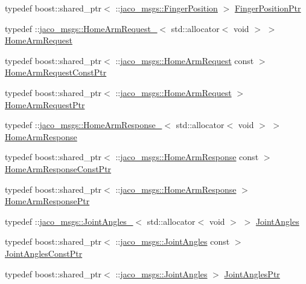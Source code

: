 \begin{DoxyCompactItemize}
typedef boost\+::shared\+\_\+ptr$<$ \+::\hyperlink{namespacejaco__msgs_a8d92f0e718e45f82b621ddf049a2f110}{jaco\+\_\+msgs\+::\+Finger\+Position} $>$ \hyperlink{namespacejaco__msgs_a07dcbbbd6b126792a3b2cbd5d9f055e3}{Finger\+Position\+Ptr}
\item 
typedef \+::\hyperlink{structjaco__msgs_1_1HomeArmRequest__}{jaco\+\_\+msgs\+::\+Home\+Arm\+Request\+\_\+}$<$ std\+::allocator$<$ void $>$ $>$ \hyperlink{namespacejaco__msgs_a8c93ee6cb88452df5f0a3c5aec628121}{Home\+Arm\+Request}
\item 
typedef boost\+::shared\+\_\+ptr$<$ \+::\hyperlink{namespacejaco__msgs_a8c93ee6cb88452df5f0a3c5aec628121}{jaco\+\_\+msgs\+::\+Home\+Arm\+Request} const  $>$ \hyperlink{namespacejaco__msgs_a120fe0caf767ec219caede5034da5237}{Home\+Arm\+Request\+Const\+Ptr}
\item 
typedef boost\+::shared\+\_\+ptr$<$ \+::\hyperlink{namespacejaco__msgs_a8c93ee6cb88452df5f0a3c5aec628121}{jaco\+\_\+msgs\+::\+Home\+Arm\+Request} $>$ \hyperlink{namespacejaco__msgs_adacfa509f618d56afb61601724347ef7}{Home\+Arm\+Request\+Ptr}
\item 
typedef \+::\hyperlink{structjaco__msgs_1_1HomeArmResponse__}{jaco\+\_\+msgs\+::\+Home\+Arm\+Response\+\_\+}$<$ std\+::allocator$<$ void $>$ $>$ \hyperlink{namespacejaco__msgs_a2638ebb5f2f675bb527ce4144b66d386}{Home\+Arm\+Response}
\item 
typedef boost\+::shared\+\_\+ptr$<$ \+::\hyperlink{namespacejaco__msgs_a2638ebb5f2f675bb527ce4144b66d386}{jaco\+\_\+msgs\+::\+Home\+Arm\+Response} const  $>$ \hyperlink{namespacejaco__msgs_af03d62d3bf564dc6a378a3b4f2d4fdcd}{Home\+Arm\+Response\+Const\+Ptr}
\item 
typedef boost\+::shared\+\_\+ptr$<$ \+::\hyperlink{namespacejaco__msgs_a2638ebb5f2f675bb527ce4144b66d386}{jaco\+\_\+msgs\+::\+Home\+Arm\+Response} $>$ \hyperlink{namespacejaco__msgs_a4bb26e957ea3bfdff2150cc2adcaef08}{Home\+Arm\+Response\+Ptr}
\item 
typedef \+::\hyperlink{structjaco__msgs_1_1JointAngles__}{jaco\+\_\+msgs\+::\+Joint\+Angles\+\_\+}$<$ std\+::allocator$<$ void $>$ $>$ \hyperlink{namespacejaco__msgs_ae38be3f0cdaac5905b3df022403d6ef4}{Joint\+Angles}
\item 
typedef boost\+::shared\+\_\+ptr$<$ \+::\hyperlink{namespacejaco__msgs_ae38be3f0cdaac5905b3df022403d6ef4}{jaco\+\_\+msgs\+::\+Joint\+Angles} const  $>$ \hyperlink{namespacejaco__msgs_a32b25235cc3066080b29ddfde0640ae9}{Joint\+Angles\+Const\+Ptr}
\item 
typedef boost\+::shared\+\_\+ptr$<$ \+::\hyperlink{namespacejaco__msgs_ae38be3f0cdaac5905b3df022403d6ef4}{jaco\+\_\+msgs\+::\+Joint\+Angles} $>$ \hyperlink{namespacejaco__msgs_a831b44f31c7fdaa5447595c9e89df4d9}{Joint\+Angles\+Ptr}

\end{DoxyCompactItemize}
